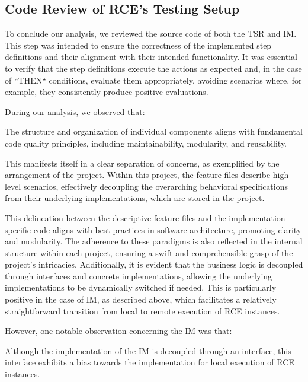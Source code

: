 \subsection{Code Review of \ac{RCE}'s Testing Setup}
\label{subsec:CodeReview}
To conclude our analysis, we reviewed the source code of both the \ac{TSR} and \ac{IM}. This step was intended to ensure the correctness of the implemented step definitions and their alignment with their intended functionality. It was essential to verify that the step definitions execute the actions as expected and, in the case of ``THEN`` conditions, evaluate them appropriately, avoiding scenarios where, for example, they consistently produce positive evaluations.

During our analysis, we observed that:
\begin{observation}
    The structure and organization of individual components aligns with fundamental code quality principles, including maintainability, modularity, and reusability.
\end{observation}

This manifests itself in a clear separation of concerns, as exemplified by the arrangement of the \texttt{} project. Within this project, the feature files describe high-level scenarios, effectively decoupling the overarching behavioral specifications from their underlying implementations, which are stored in the \texttt{} project. 

This delineation between the descriptive feature files and the implementation-specific code aligns with best practices in software architecture, promoting clarity and modularity. The adherence to these paradigms is also reflected in the internal structure within each project, ensuring a swift and comprehensible grasp of the project's intricacies. Additionally, it is evident that the business logic is decoupled through interfaces and concrete implementations, allowing the underlying implementations to be dynamically switched if needed. This is particularly positive in the case of \ac{IM}, as described above, which facilitates a relatively straightforward transition from local to remote execution of \ac{RCE} instances. 

\newpage
However, one notable observation concerning the \ac{IM} was that:
\begin{observation}
    Although the implementation of the \acl{IM} is decoupled through an interface, this interface exhibits a bias towards the implementation for local execution of RCE instances.
\end{observation}

